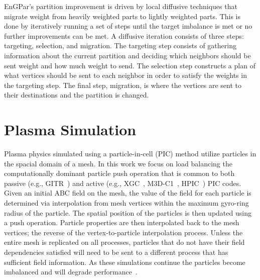 \documentclass[conference]{IEEEtran}
\begin{document}
EnGPar's partition improvement is driven by local diffusive techniques that migrate weight
from heavily weighted parts to lightly weighted parts. This is done by iteratively running
a set of steps until the target imbalance is met or no further improvements can be met.
A diffusive iteration consists of three steps: targeting, selection, and migration.
The targeting step consists of gathering information about the current partition and deciding
which neighbors should be sent weight and how much weight to send. The selection step constructs
a plan of what vertices should be sent to each neighbor in order to satisfy the weights in
the targeting step. The final step, migration, is where the vertices are sent to their
destinations and the partition is changed.

\section{Plasma Simulation}

Plasma physics simulated using a particle-in-cell (PIC) method utilize particles
in the spacial domain of a mesh.
In this work we focus on load balancing the computationally dominant particle
push operation that is common to both passive (e.g., GITR~\cite{younkin2017})
and active (e.g., XGC~\cite{chang2004numerical,Ku2016467,ku2009},
M3D-C1~\cite{jardin2012multiple}, HPIC~\cite{hpic2017}) PIC codes.
Given an initial ABC field on the mesh, the value of the field for each particle
is determined via interpolation from mesh vertices within the maximum
gyro-ring radius of the particle.
The spatial position of the particles is then updated using a push operation.
Particle properties are then interpolated back to the mesh vertices; the reverse
of the vertex-to-particle interpolation process.
Unless the entire mesh is replicated on all processes, particles that do not
have their field dependencies satisfied will need to be
sent to a different process that has sufficient field information.
As these simulations continue the particles become imbalanced and will degrade
performance~\cite{carmona1997,plimptonPic2003,worleyBalancePic2016}.
\end{document}
